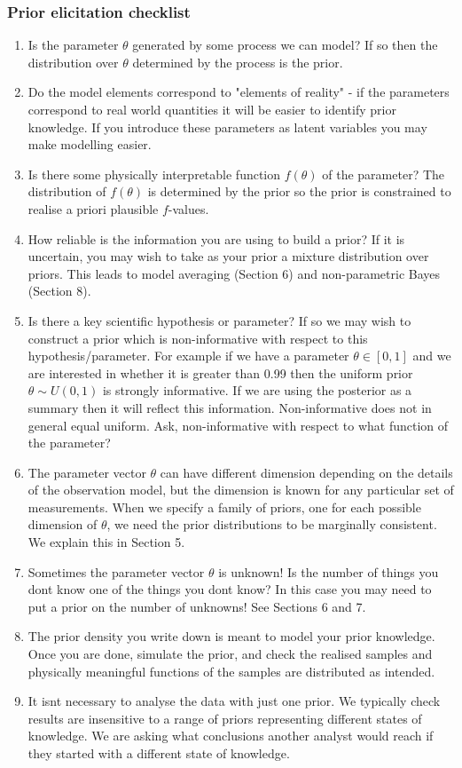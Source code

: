 \documentclass{article}
\begin{document}
\subsubsection{Prior elicitation checklist}
\begin{enumerate}
    \item Is the parameter $\theta$ generated by some process we can model? If so then the distribution over $\theta$ determined by the process is the prior.
    \item Do the model elements correspond to "elements of reality" - if the parameters correspond to real world quantities it will be easier to identify prior knowledge. If you introduce these parameters as latent variables you may make modelling easier.
    \item Is there some physically interpretable function $f(\theta)$ of the parameter? The distribution of $f(\theta)$ is determined by the prior so the prior is constrained to realise a priori plausible $f$-values.
    \item How reliable is the information you are using to build a prior? If it is uncertain, you may wish to take as your prior a mixture distribution over priors. This leads to model averaging (Section 6) and non-parametric Bayes (Section 8).
    \item Is there a key scientific hypothesis or parameter? If so we may wish to construct a prior which is non-informative with respect to this hypothesis/parameter. For example if we have a parameter $\theta \in[0,1]$ and we are interested in whether it is greater than 0.99 then the uniform prior $\theta \sim U(0,1)$ is strongly informative. If we are using the posterior as a summary then it will reflect this information. Non-informative does not in general equal uniform. Ask, non-informative with respect to what function of the parameter?
    \item The parameter vector $\theta$ can have different dimension depending on the details of the observation model, but the dimension is known for any particular set of measurements. When we specify a family of priors, one for each possible dimension of $\theta$, we need the prior distributions to be marginally consistent. We explain this in Section 5.
    \item  Sometimes the parameter vector $\theta$ is unknown! Is the number of things you dont know one of the things you dont know? In this case you may need to put a prior on the number of unknowns! See Sections 6 and 7.
    \item The prior density you write down is meant to model your prior knowledge. Once you are done, simulate the prior, and check the realised samples and physically meaningful functions of the samples are distributed as intended.
    \item It isnt necessary to analyse the data with just one prior. We typically check results are insensitive to a range of priors representing different states of knowledge. We are asking what conclusions another analyst would reach if they started with a different state of knowledge.
\end{enumerate}
\end{document}
